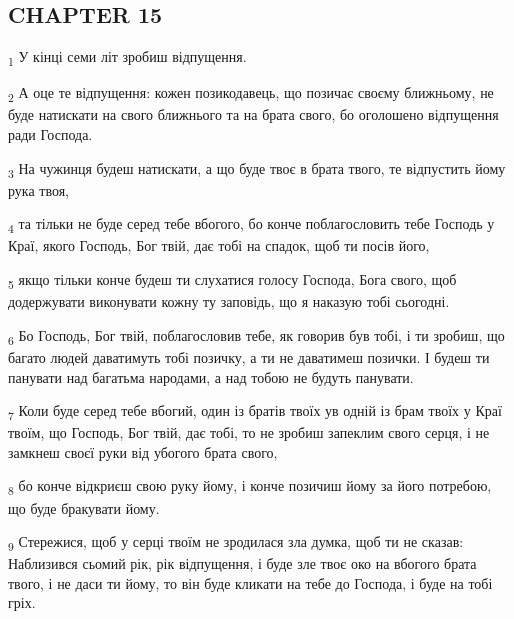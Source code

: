 \subsection{CHAPTER 15}
\begin{tcolorbox}
\textsubscript{1} У кінці семи літ зробиш відпущення.
\end{tcolorbox}
\begin{tcolorbox}
\textsubscript{2} А оце те відпущення: кожен позикодавець, що позичає своєму ближньому, не буде натискати на свого ближнього та на брата свого, бо оголошено відпущення ради Господа.
\end{tcolorbox}
\begin{tcolorbox}
\textsubscript{3} На чужинця будеш натискати, а що буде твоє в брата твого, те відпустить йому рука твоя,
\end{tcolorbox}
\begin{tcolorbox}
\textsubscript{4} та тільки не буде серед тебе вбогого, бо конче поблагословить тебе Господь у Краї, якого Господь, Бог твій, дає тобі на спадок, щоб ти посів його,
\end{tcolorbox}
\begin{tcolorbox}
\textsubscript{5} якщо тільки конче будеш ти слухатися голосу Господа, Бога свого, щоб додержувати виконувати кожну ту заповідь, що я наказую тобі сьогодні.
\end{tcolorbox}
\begin{tcolorbox}
\textsubscript{6} Бо Господь, Бог твій, поблагословив тебе, як говорив був тобі, і ти зробиш, що багато людей даватимуть тобі позичку, а ти не даватимеш позички. І будеш ти панувати над багатьма народами, а над тобою не будуть панувати.
\end{tcolorbox}
\begin{tcolorbox}
\textsubscript{7} Коли буде серед тебе вбогий, один із братів твоїх ув одній із брам твоїх у Краї твоїм, що Господь, Бог твій, дає тобі, то не зробиш запеклим свого серця, і не замкнеш своєї руки від убогого брата свого,
\end{tcolorbox}
\begin{tcolorbox}
\textsubscript{8} бо конче відкриєш свою руку йому, і конче позичиш йому за його потребою, що буде бракувати йому.
\end{tcolorbox}
\begin{tcolorbox}
\textsubscript{9} Стережися, щоб у серці твоїм не зродилася зла думка, щоб ти не сказав: Наблизився сьомий рік, рік відпущення, і буде зле твоє око на вбогого брата твого, і не даси ти йому, то він буде кликати на тебе до Господа, і буде на тобі гріх.
\end{tcolorbox}
